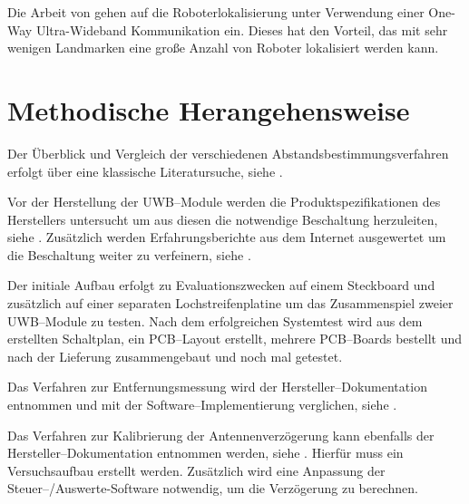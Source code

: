 \documentclass[12pt]{article}
\begin{document}
Die Arbeit \cite{ledergerber2015robot} von \citeauthor{ledergerber2015robot} gehen auf die Roboterlokalisierung unter Verwendung einer One-Way Ultra-Wideband Kommunikation ein. Dieses hat den Vorteil, das mit sehr wenigen Landmarken eine große Anzahl von Roboter lokalisiert werden kann.


%
%
%
\section{Methodische Herangehensweise}
Der Überblick und Vergleich der verschiedenen Abstandsbestimmungsverfahren erfolgt über eine klassische Literatursuche, siehe \cite{lee2007comparative, herranz2010studying, zekavat2011handbook}.

Vor der Herstellung der UWB--Module werden die Produktspezifikationen des Herstellers untersucht um aus diesen die notwendige Beschaltung herzuleiten, siehe \cite{decawave2016dwm1kdatasheet, decawave2013power}. Zusätzlich werden Erfahrungsberichte aus dem Internet ausgewertet um die Beschaltung weiter zu verfeinern, siehe \cite{Trojer2015, Holder2016, Holder2016a}.

Der initiale Aufbau erfolgt zu Evaluationszwecken auf einem Steckboard und zusätzlich auf einer separaten Lochstreifenplatine um das Zusammenspiel zweier UWB--Module zu testen. Nach dem erfolgreichen Systemtest wird aus dem erstellten Schaltplan, ein PCB--Layout erstellt, mehrere PCB--Boards bestellt und nach der Lieferung zusammengebaut und noch mal getestet.

Das Verfahren zur Entfernungsmessung wird der Hersteller--Dokumentation entnommen und mit der Software--Implementierung verglichen, siehe \cite{decawave2015twr, decawave2014error, Trojer2015}.

Das Verfahren zur Kalibrierung der Antennenverzögerung kann ebenfalls der Hersteller--Dokumentation entnommen werden, siehe \cite{decawave2014calibration}. Hierfür muss ein Versuchsaufbau erstellt werden. Zusätzlich wird eine Anpassung der Steuer--/Auswerte-Software notwendig, um die Verzögerung zu berechnen.
\end{document}

